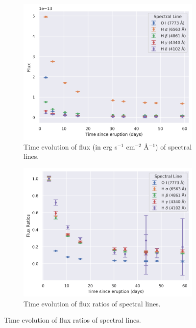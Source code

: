 \documentclass{tda}
\begin{document}
	\begin{figure} [h!]
		\centering
		\begin{subfigure} {.49\textwidth}
			\centering
			\includegraphics[width=\linewidth]{../codes/plots/line_fluxes_evolution.png}
			\caption{Time evolution of flux (in erg s\(^{-1}\) cm\(^{-2}\) \r{A}\(^{-1}\)) of spectral lines.}
			\label{fig:line_flux_evolution}
		\end{subfigure} %
		\hfill
		\begin{subfigure} {.49\textwidth}
			\centering
			\includegraphics[width=\linewidth]{../codes/plots/line_flux_ratios_evolution.png}
			\caption{Time evolution of flux ratios of spectral lines.}

\end{subfigure}
\end{figure}
\end{document}

